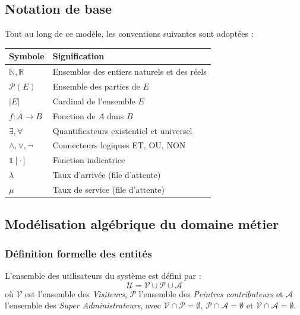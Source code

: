 \documentclass[12pt,a4paper]{report}
\begin{document}
\subsection*{Notation de base}

Tout au long de ce modèle, les conventions suivantes sont adoptées :

\begin{center}
\renewcommand{\arraystretch}{1.4}
\begin{tabular}{ll}
\toprule
\textbf{Symbole} & \textbf{Signification} \\
\midrule
$\mathbb{N}, \mathbb{R}$ & Ensembles des entiers naturels et des réels \\
$\mathcal{P}(E)$ & Ensemble des parties de $E$ \\
$|E|$ & Cardinal de l'ensemble $E$ \\
$f : A \to B$ & Fonction de $A$ dans $B$ \\
$\exists, \forall$ & Quantificateurs existentiel et universel \\
$\land, \lor, \lnot$ & Connecteurs logiques ET, OU, NON \\
$\mathbb{1}[\cdot]$ & Fonction indicatrice \\
$\lambda$ & Taux d'arrivée (file d'attente) \\
$\mu$ & Taux de service (file d'attente) \\
\bottomrule
\end{tabular}
\end{center}

\subsection{Modélisation algébrique du domaine métier}

\subsubsection*{Définition formelle des entités}

\begin{definition}
L'ensemble des utilisateurs du système est défini par :
\[
\mathcal{U} = \mathcal{V} \cup \mathcal{P} \cup \mathcal{A}
\]
où $\mathcal{V}$ est l'ensemble des \emph{Visiteurs}, $\mathcal{P}$ l'ensemble des \emph{Peintres contributeurs}
et $\mathcal{A}$ l'ensemble des \emph{Super Administrateurs}, avec $\mathcal{V} \cap \mathcal{P} = \emptyset$,
$\mathcal{P} \cap \mathcal{A} = \emptyset$ et $\mathcal{V} \cap \mathcal{A} = \emptyset$.
\end{definition}
\end{document}
